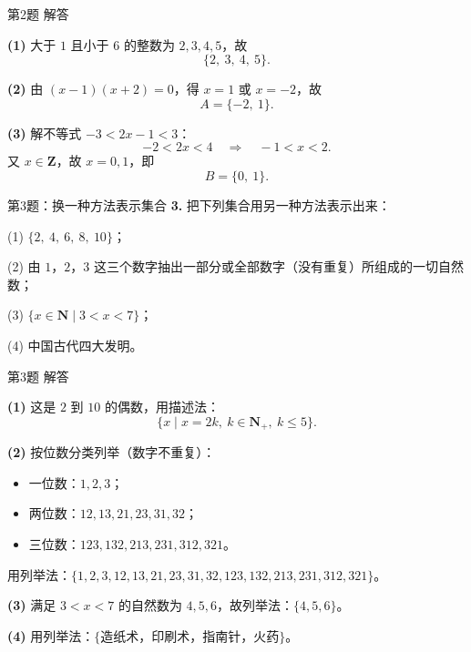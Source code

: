 \documentclass[10pt,aspectratio=169,serif]{beamer}
\begin{document}
\begin{frame}[t]{第2题 解答}
\begin{tcolorbox}[colback=orange!10,colframe=orange,title=\textbf{解}]
\textbf{(1)} 大于 $1$ 且小于 $6$ 的整数为 $2, 3, 4, 5$，故
\[
\{2,\ 3,\ 4,\ 5\}.
\]

\vspace{0.5em}
\textbf{(2)} 由 $(x-1)(x+2) = 0$，得 $x = 1$ 或 $x = -2$，故
\[
A = \{-2,\ 1\}.
\]

\vspace{0.5em}
\textbf{(3)} 解不等式 $-3 < 2x - 1 < 3$：
\[
-2 < 2x < 4 \quad\Rightarrow\quad -1 < x < 2.
\]
又 $x \in \mathbf{Z}$，故 $x = 0, 1$，即
\[
B = \{0,\ 1\}.
\]
\end{tcolorbox}
\end{frame}

\begin{frame}[t]{第3题：换一种方法表示集合}
\textbf{3.} 把下列集合用另一种方法表示出来：

\vspace{0.5em}
(1) $\{2,\ 4,\ 6,\ 8,\ 10\}$；

\vspace{0.5em}
(2) 由 $1$，$2$，$3$ 这三个数字抽出一部分或全部数字（没有重复）所组成的一切自然数；

\vspace{0.5em}
(3) $\{x \in \mathbf{N} \mid 3 < x < 7\}$；

\vspace{0.5em}
(4) 中国古代四大发明。
\end{frame}

\begin{frame}[t]{第3题 解答}
\begin{tcolorbox}[colback=orange!10,colframe=orange,title=\textbf{解}]
\textbf{(1)} 这是 $2$ 到 $10$ 的偶数，用描述法：
\[
\{x \mid x = 2k,\ k \in \mathbf{N}_+,\ k \le 5\}.
\]

\vspace{0.3em}
\textbf{(2)} 按位数分类列举（数字不重复）：
\begin{itemize}
  \item 一位数：$1, 2, 3$；
  \item 两位数：$12, 13, 21, 23, 31, 32$；
  \item 三位数：$123, 132, 213, 231, 312, 321$。
\end{itemize}
用列举法：$\{1, 2, 3, 12, 13, 21, 23, 31, 32, 123, 132, 213, 231, 312, 321\}$。

\vspace{0.3em}
\textbf{(3)} 满足 $3 < x < 7$ 的自然数为 $4, 5, 6$，故列举法：$\{4, 5, 6\}$。

\vspace{0.3em}
\textbf{(4)} 用列举法：$\{$造纸术，印刷术，指南针，火药$\}$。
\end{tcolorbox}
\end{frame}
\end{document}
